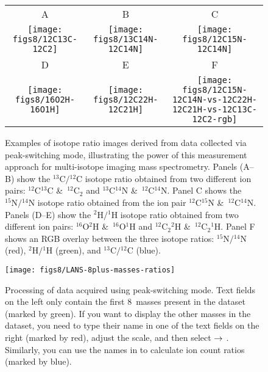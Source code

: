 \def\scf{0.36}
\begin{figure}[!ht]
\centering
\begin{tabular}{ccc}
A & B & C \\
\texttt{[image: figs8/12C13C-12C2]}
&
\texttt{[image: figs8/13C14N-12C14N]}
&
\texttt{[image: figs8/12C15N-12C14N]}
\\
D & E & F\\
\texttt{[image: figs8/16O2H-16O1H]}
&
\texttt{[image: figs8/12C22H-12C21H]}
&
\texttt{[image: figs8/12C15N-12C14N-vs-12C22H-12C21H-vs-12C13C-12C2-rgb]}
\end{tabular}
\caption{\label{fig:LANS-8plus-ratios}%
Examples of isotope ratio images derived from data collected via peak-switching mode, illustrating the power of this measurement approach for multi-isotope imaging mass spectrometry. Panels (A--B) show the ${}^{13}\mathrm{C}/{}^{12}\mathrm{C}$ isotope ratio obtained from two different ion pairs: ${}^{12}\mathrm{C}{}^{13}\mathrm{C}$ \&\ ${}^{12}\mathrm{C}_2$ and ${}^{13}\mathrm{C}{}^{14}\mathrm{N}$ \&\ ${}^{12}\mathrm{C}{}^{14}\mathrm{N}$. Panel C shows the ${}^{15}\mathrm{N}/{}^{14}\mathrm{N}$ isotope ratio obtained from the ion pair ${}^{12}\mathrm{C}{}^{15}\mathrm{N}$ \&\ ${}^{12}\mathrm{C}{}^{14}\mathrm{N}$. Panels (D--E) show the ${}^{2}\mathrm{H}/{}^{1}\mathrm{H}$ isotope ratio obtained from two different ion pairs: ${}^{16}\mathrm{O}{}^{2}\mathrm{H}$ \&\ ${}^{16}\mathrm{O}{}^{1}\mathrm{H}$ and ${}^{12}\mathrm{C}_2{}^{2}\mathrm{H}$ \&\ ${}^{12}\mathrm{C}_2{}^{1}\mathrm{H}$. Panel F shows an RGB overlay between the three isotope ratios: ${}^{15}\mathrm{N}/{}^{14}\mathrm{N}$ (red), ${}^{2}\mathrm{H}/{}^{1}\mathrm{H}$ (green), and ${}^{13}\mathrm{C}/{}^{12}\mathrm{C}$ (blue).}
\end{figure}

\begin{figure}[!hb]
\centering
\texttt{[image: figs8/LANS-8plus-masses-ratios]}
\caption{\label{fig:LANS-8plus-extra-masses}%
Processing of data acquired using peak-switching mode. Text fields on the left only contain the first 8~masses present in the dataset (marked by green). If you want to display the other masses in the dataset, you need to type their name in one of the  text fields on the right (marked by red), adjust the scale, and then select  $\rightarrow$ . Similarly, you can use the names in  to calculate ion count ratios (marked by blue).}
\end{figure}


